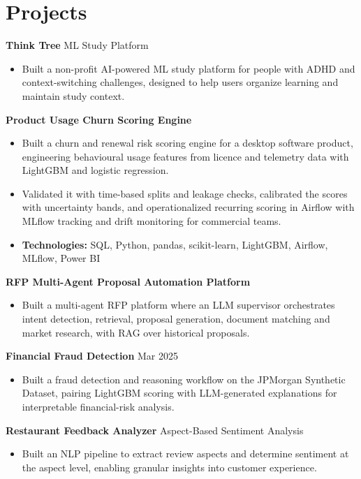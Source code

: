 \documentclass[10pt,a4paper]{article}
\begin{document}
\section{Projects}
\textbf{Think Tree} \textbar{} ML Study Platform\par
\begin{itemize}
  \item Built a non-profit AI-powered ML study platform for people with ADHD and context-switching challenges, designed to help users organize learning and maintain study context.
\end{itemize}
\textbf{Product Usage Churn Scoring Engine}\par
\begin{itemize}
  \item Built a churn and renewal risk scoring engine for a desktop software product, engineering behavioural usage features from licence and telemetry data with LightGBM and logistic regression.
  \item Validated it with time-based splits and leakage checks, calibrated the scores with uncertainty bands, and operationalized recurring scoring in Airflow with MLflow tracking and drift monitoring for commercial teams.
  \item \textbf{Technologies:} SQL, Python, pandas, scikit-learn, LightGBM, Airflow, MLflow, Power BI
\end{itemize}
\textbf{RFP Multi-Agent Proposal Automation Platform}\par
\begin{itemize}
  \item Built a multi-agent RFP platform where an LLM supervisor orchestrates intent detection, retrieval, proposal generation, document matching and market research, with RAG over historical proposals.
\end{itemize}
\textbf{Financial Fraud Detection} \textbar{} Mar 2025\par
\begin{itemize}
  \item Built a fraud detection and reasoning workflow on the JPMorgan Synthetic Dataset, pairing LightGBM scoring with LLM-generated explanations for interpretable financial-risk analysis.
\end{itemize}
\textbf{Restaurant Feedback Analyzer} \textbar{} Aspect-Based Sentiment Analysis\par
\begin{itemize}
  \item Built an NLP pipeline to extract review aspects and determine sentiment at the aspect level, enabling granular insights into customer experience.
\end{itemize}
\end{document}
